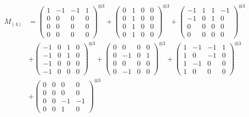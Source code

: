 \documentclass{article}
\newcommand{\Mthree}{%
    M_{(4)}
}
\begin{document}
        \newpage
        
        \footnotesize{
        \begin{align}
        \Mthree
        &= \label{Rs16-Rc11-Solution-2-c1} \begin{pmatrix} 1 & -1 & -1 & 1 \\ 0 & 0 & 0 & 0 \\ 0 & 0 & 0 & 0 \\ 0 & 0 & 0 & 0 \end{pmatrix}^{\otimes 3} 
            + \begin{pmatrix} 0 & 1 & 0 & 0 \\ 0 & 1 & 0 & 0 \\ 0 & 1 & 0 & 0 \\ 0 & 1 & 0 & 0 \end{pmatrix}^{\otimes 3} 
            + \begin{pmatrix} -1 & 1 & 1 & -1 \\ -1 & 0 & 1 & 0 \\ 0 & 0 & 0 & 0 \\ 0 & 0 & 0 & 0 \end{pmatrix}^{\otimes 3} \\
        &+ \label{Rs16-Rc11-Solution-2-c4} \begin{pmatrix} -1 & 0 & 1 & 0 \\ -1 & 0 & 1 & 0 \\ -1 & 0 & 0 & 0 \\ -1 & 0 & 0 & 0 \end{pmatrix}^{\otimes 3} 
            + \begin{pmatrix} 0 & 0 & 0 & 0 \\ 0 & -1 & 0 & 1 \\ 0 & 0 & 0 & 0 \\ 0 & -1 & 0 & 0 \end{pmatrix}^{\otimes 3} 
            + \begin{pmatrix} 1 & -1 & -1 & 1 \\ 1 & 0 & -1 & 0 \\ 1 & -1 & 0 & 0 \\ 1 & 0 & 0 & 0 \end{pmatrix}^{\otimes 3} \\
        &+ \label{Rs16-Rc11-Solution-2-c7} \begin{pmatrix} 0 & 0 & 0 & 0 \\ 0 & 0 & 0 & 0 \\ 0 & 0 & -1 & -1 \\ 0 & 0 & 1 & 0 \end{pmatrix}^{\otimes 3} 

\end{align}}
\end{document}
